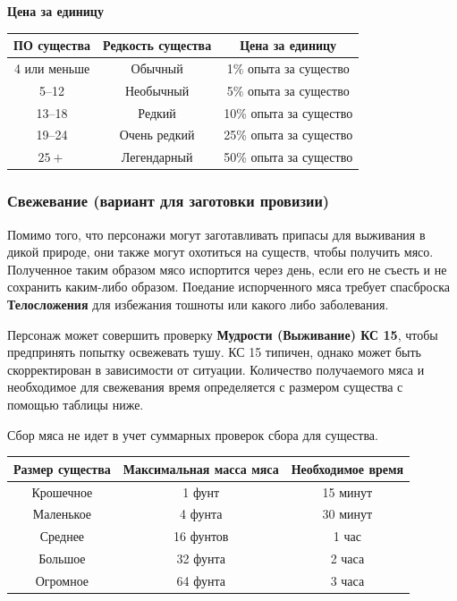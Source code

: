 \documentclass[a4paper, 9pt, twocolumn]{book}
\begin{document}
	\textbf{Цена за единицу}
	\begin{center}
		\begin{tabular}{|c|c|c|}
			\hline
			\textbf{ПО существа} & \textbf{Редкость существа} & \textbf{Цена за единицу} \\
			\hline
			4 или меньше & Обычный & 1\% опыта за существо \\
			\hline
			5--12 & Необычный & 5\% опыта за существо \\
			\hline
			13--18 & Редкий & 10\% опыта за существо \\
			\hline
			19--24 & Очень редкий & 25\% опыта за существо  \\
			\hline
			$25+$ & Легендарный & 50\% опыта за существо \\
			\hline
		\end{tabular}
	\end{center}
	
	\subsubsection{Свежевание (вариант для заготовки провизии)}
	
	Помимо того, что персонажи могут заготавливать припасы для выживания в дикой природе, они также могут охотиться на существ, чтобы получить мясо. Полученное таким образом мясо испортится через день, если его не съесть и не сохранить каким-либо образом. Поедание испорченного мяса требует спасброска \textbf{Телосложения} для избежания тошноты или какого либо заболевания.
	
	Персонаж может совершить проверку \textbf{Мудрости (Выживание) КС 15}, чтобы предпринять попытку освежевать тушу. КС 15 типичен, однако может быть скорректирован в зависимости от ситуации. Количество получаемого мяса и необходимое для свежевания время определяется с размером существа с помощью таблицы ниже.
	
	Сбор мяса не идет в учет суммарных проверок сбора для существа.
	
	\begin{center}
	\begin{tabular}{|c|c|c|}
		\hline
		\textbf{Размер существа} & \textbf{Максимальная масса мяса} & \textbf{Необходимое время} \\
		\hline
		Крошечное & 1 фунт & 15 минут \\
		\hline
		Маленькое & 4 фунта & 30 минут \\
		\hline
		Среднее & 16 фунтов & 1 час \\
		\hline
		Большое & 32 фунта & 2 часа \\
		\hline
		Огромное & 64 фунта & 3 часа \\
		\hline
	\end{tabular}	
	\end{center}
	
\end{document}
